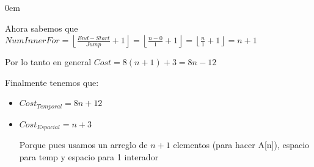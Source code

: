 \documentclass[12pt, fleqn]{article}                            %
\newenvironment{SmallIndentation}[1][0.75em]                    %
        {\begin{adjustwidth}{#1}{}\begin{footnotesize}}             %
        {\end{footnotesize}\end{adjustwidth}}                       %
\theoremstyle{break}                                            %
\newcommand{\Floor}[1]{\left \lfloor #1 \right \rfloor}         %
\begin{document}
\begin{SmallIndentation}[0em]
\begin{enumerate}
                Ahora sabemos que 
                $NumInnerFor 
                    = \Floor{\frac{End - Start}{Jump} + 1}
                    = \Floor{\frac{n - 0}{1} + 1}
                    = \Floor{\frac{n}{1} + 1}
                    = n+1$

                Por lo tanto en general $Cost = 8(n+1)+3 = 8n - 12$

        \end{enumerate}

        Finalmente tenemos que:
        \begin{itemize}
            \item $Cost_{Temporal} = 8n + 12$
            \item $Cost_{Espacial} = n + 3$

                Porque pues usamos un arreglo de $n + 1$ elementos (para hacer A[n]), 
                espacio para temp y espacio para 1 interador
        \end{itemize}
            
    \end{SmallIndentation}



    \clearpage
\end{document}
